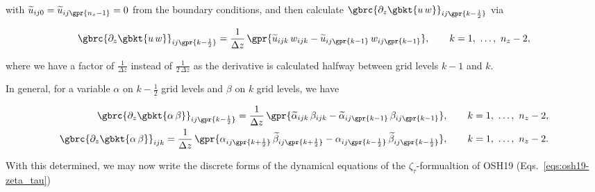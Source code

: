 with $\widetilde{u}_{ij0} = \widetilde{u}_{ij\gpr{n_z -1}} = 0$ from the boundary conditions, and then calculate $\gbrc{\partial_z \gbkt{u\,w}}_{ij\gpr{k-\frac{1}{2}}}$ via

\begin{equation}
	\gbrc{\partial_z \gbkt{u\,w}}_{ij\gpr{k-\frac{1}{2}}} = \frac{1}{\Delta z}\,\gpr{\widetilde{u}_{ijk}\,w_{ijk} - \widetilde{u}_{ij\gpr{k-1}}\,w_{ij\gpr{k-1}}},\qquad k = 1,\ \dots,\ n_z - 2,
\end{equation}

where we have a factor of $\frac{1}{\Delta z}$ instead of $\frac{1}{2\,\Delta z}$ as the derivative is calculated halfway between grid levels $k-1$ and $k$.

In general, for a variable $\alpha$ on $k-\frac{1}{2}$ grid levels and $\beta$ on $k$ grid levels, we have

\begin{subequations}
	\begin{align}
		\gbrc{\partial_z \gbkt{\alpha\,\beta}}_{ij\gpr{k-\frac{1}{2}}} = \frac{1}{\Delta z}\,\gpr{\widetilde{\alpha}_{ijk}\,\beta_{ijk} - \widetilde{\alpha}_{ij\gpr{k-1}}\,\beta_{ij\gpr{k-1}}},\qquad k = 1,\ \dots,\ n_z - 2, \\
		\gbrc{\partial_z \gbkt{\alpha\,\beta}}_{ijk} = \frac{1}{\Delta z}\,\gpr{\alpha_{ij\gpr{k+\frac{1}{2}}}\,\widetilde{\beta}_{ij\gpr{k+\frac{1}{2}}} - \alpha_{ij\gpr{k-\frac{1}{2}}}\,\widetilde{\beta}_{ij\gpr{k-\frac{1}{2}}}},\qquad k = 1,\ \dots,\ n_z - 2.
	\end{align}
\end{subequations}

With this determined, we may now write the discrete forms of the dynamical equations of the $\zeta_{\tau}$-formualtion of OSH19 (Eqs.~\ref{eqs:osh19-zeta_tau})

